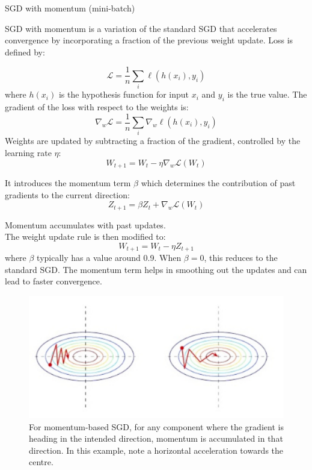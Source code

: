\begin{definitionbox}{SGD with momentum (mini-batch)}


SGD with momentum is a variation of the standard SGD that accelerates convergence by incorporating a fraction of the previous weight update. Loss is defined by:

\[ \mathcal{L} = \frac{1}{n} \sum_{i} \ell(h(x_i), y_i) \]
where \( h(x_i) \) is the hypothesis function for input \( x_i \) and \( y_i \) is the true value. The gradient of the loss with respect to the weights is:
\[ \nabla_w \mathcal{L} = \frac{1}{n} \sum_{i} \nabla_w \ell(h(x_i), y_i) \]
Weights are updated by subtracting a fraction of the gradient, controlled by the learning rate \( \eta \):
\[ W_{t+1} = W_t - \eta \nabla_w \mathcal{L}(W_t) \]

It introduces the momentum term \( \beta \) which determines the contribution of past gradients to the current direction:
\[ Z_{t+1} = \beta Z_t + \nabla_w \mathcal{L}(W_t) \]

Momentum accumulates with past updates.\\


The weight update rule is then modified to:
\[ W_{t+1} = W_t - \eta Z_{t+1} \]
where \( \beta \) typically has a value around 0.9. When \( \beta = 0 \), this reduces to the standard SGD. The momentum term helps in smoothing out the updates and can lead to faster convergence.

\begin{figure}[H]
    \centering
    \includegraphics[width=0.5\linewidth]{img/sgd_mom.png}
    \caption{For momentum-based SGD, for any component where the gradient is heading in the intended direction, momentum is accumulated in that direction. In this example, note a horizontal acceleration towards the centre.}
    
\end{figure}
\end{definitionbox}


